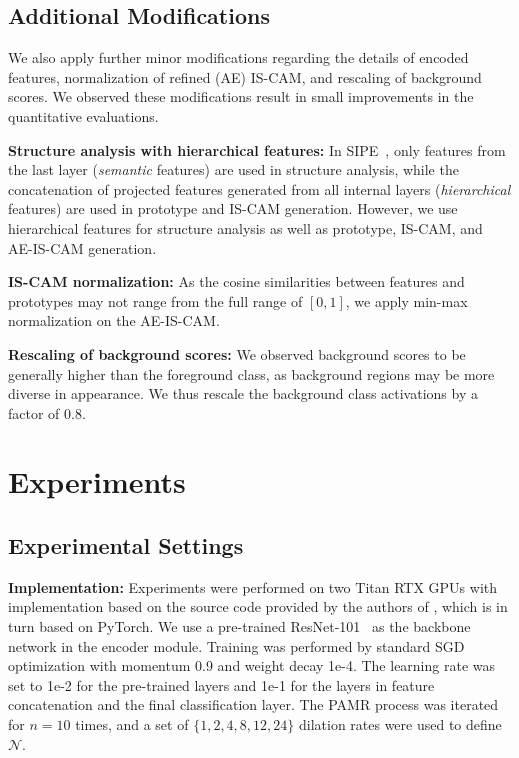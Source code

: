 \documentclass{article}
\begin{document}
\subsection{Additional Modifications}
\label{sec:sipe}

We also apply further minor modifications regarding the details of encoded features, normalization of refined (AE) IS-CAM, and rescaling of background scores. 
We observed these modifications result in small improvements in the quantitative evaluations.

\noindent
{\bf Structure analysis with hierarchical features:} In SIPE~\cite{SIPE}, only features from the last layer (\emph{semantic} features) are used in structure analysis, while the concatenation of projected features generated from all internal layers (\emph{hierarchical} features) are used in prototype and IS-CAM generation.
However, we use hierarchical features for structure analysis as well as prototype, IS-CAM, and AE-IS-CAM generation.

\noindent
{\bf IS-CAM normalization:} As the cosine similarities between features and prototypes may not range from the full range of $[0,1]$, we apply min-max normalization on the AE-IS-CAM. 

\noindent
{\bf Rescaling of background scores:} We observed background scores to be generally higher than the foreground class, as background regions may be more diverse in appearance. We thus rescale the background class activations by a factor of $0.8$.

\section{Experiments}
\label{sec:exp}

\subsection{Experimental Settings}
\label{sec:impl}

\noindent
{\bf Implementation:}
Experiments were performed on two Titan RTX GPUs with implementation based on the source code provided by the authors of \cite{SIPE}, which is in turn based on PyTorch. We use a pre-trained ResNet-101~\cite{ResNet} as the backbone network in the encoder module. Training was performed by standard SGD optimization with momentum 0.9 and weight decay 1e-4. The learning rate was set to 1e-2 for the pre-trained layers and 1e-1 for the layers in feature concatenation and the final classification layer.
The PAMR process was iterated for $n=10$ times, and a set of $\{1,2,4,8,12,24\}$ dilation rates were used to define $\mathcal N$. 
\end{document}
